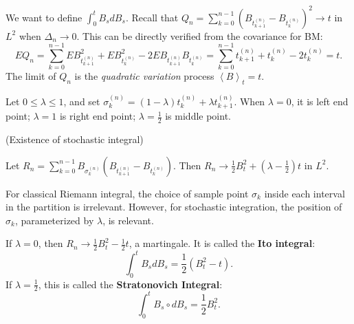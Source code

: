 We want to define  $\int _0^t B_s d B_s$.
Recall that $Q_n = \sum_{k=0}^{n-1} \left( B_{t_{k+1}^{(n)}} - B_{t_{k}^{(n)}} \right)^2 \to  t$ in $L^2$ when $\Delta_n \to  0$. This can be directly verified from the covariance for BM:
\[
	E Q_n = 
	\sum_{k=0}^{n-1} E B_{t_{k+1}^{(n)}}^2 + E B_{t_{k}^{(n)}}^2 - 2 EB_{t_{k+1}^{(n)}}B_{t_{k}^{(n)}}
	=
	\sum_{k=0}^{n-1} t_{k+1}^{(n)} + t_{k}^{(n)} - 2 t_{k}^{(n)} = t
.\] 
The limit of $Q_n$ is the \textit{quadratic variation} process $\left\langle B \right\rangle _t = t$.

Let $0 \le  \lambda \le 1$, and set $\sigma_k^{(n)} = (1 - \lambda) t_k^{(n)} + \lambda t_{k+1}^{(n)}$. When $\lambda = 0$, it is left end point; $\lambda = 1$ is right end point; $\lambda = \frac{1}{2}$ is middle point.


\begin{theorem}(Existence of stochastic integral)

	Let $R_n = \sum_{k=0}^{n-1} B_{\sigma_k^{(n)}} \left( B_{t_{k+1}^{(n)}} - B_{t_k^{(n)}} \right) $. Then $R_n \to \frac{1}{2} B_t^2 + (\lambda - \frac{1}{2}) t$ in $L^2$.
\end{theorem}
\begin{remark}
	For classical Riemann integral, the choice of sample point $\sigma_k$ inside each interval in the partition is irrelevant. However, for stochastic integration, the position of $\sigma_k$, parameterized by $\lambda$, is relevant. 
\end{remark}

If $\lambda = 0$, then $R_n \to \frac{1}{2} B_t^2 - \frac{1}{2} t$, a martingale. It is called the \textbf{Ito integral}:
\[
	\int _0^t B_s dB_s = \frac{1}{2}\left( B_t^2  - t\right) 
.\] 
If $\lambda = \frac{1}{2}$, this is called the \textbf{Stratonovich Integral}:
\[
	\int _0^t B_s \circ d B_s = \frac{1}{2} B_t^2
.\] 

